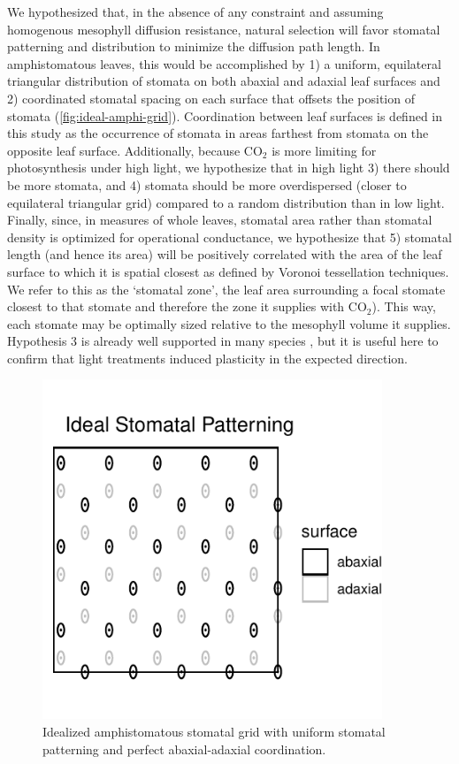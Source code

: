 \documentclass[webpdf,large,modern,unnumsec,namedate]{oup-authoring-template}
\begin{document}
We hypothesized that, in the absence of any constraint and assuming
homogenous mesophyll diffusion resistance, natural selection will favor
stomatal patterning and distribution to minimize the diffusion path
length. In amphistomatous leaves, this would be accomplished by 1) a
uniform, equilateral triangular distribution of stomata on both abaxial
and adaxial leaf surfaces and 2) coordinated stomatal spacing on each
surface that offsets the position of stomata
(\autoref{fig:ideal-amphi-grid}). Coordination between leaf surfaces is
defined in this study as the occurrence of stomata in areas farthest
from stomata on the opposite leaf surface. Additionally, because
CO\(_2\) is more limiting for photosynthesis under high light, we
hypothesize that in high light 3) there should be more stomata, and 4)
stomata should be more overdispersed (closer to equilateral triangular
grid) compared to a random distribution than in low light. Finally,
since, in measures of whole leaves, stomatal area rather than stomatal
density is optimized for operational conductance, we hypothesize that 5)
stomatal length (and hence its area) will be positively correlated with
the area of the leaf surface to which it is spatial closest as defined
by Voronoi tessellation techniques. We refer to this as the `stomatal
zone', the leaf area surrounding a focal stomate closest to that stomate
and therefore the zone it supplies with CO\(_2\)). This way, each
stomate may be optimally sized relative to the mesophyll volume it
supplies. Hypothesis 3 is already well supported in many species
\citep{poorter_metaanalysis_2019}, but it is useful here to confirm that
light treatments induced plasticity in the expected direction.

\begin{figure}[ht]
\includegraphics[width = 4in]{figures/ideal-amphi-grid.pdf}
\caption{Idealized amphistomatous stomatal grid with uniform stomatal patterning and perfect abaxial-adaxial coordination.}
\label{fig:ideal-amphi-grid}
\end{figure}
\end{document}
